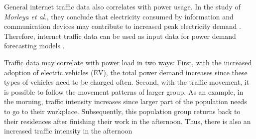 General internet traffic data also correlates with power usage.
In the study of \textit{Morleya et al.}, they conclude that 
electricity consumed by information and communication devices
may contribute to increased peak electricity demand 
\cite{internettrafficenergycorrelation}.
Therefore, internet traffic data can be used as input data for 
power demand forecasting models \cite{electricityinternetforecast}. 

Traffic data may correlate with power load in two ways: First, with the
increased adoption of electric vehicles (EV), the total power demand increases 
since these types of vehicles need to be charged often. 
Second, with the traffic movement, it is possible to follow the
movement patterns of larger group. As an example, in the morning,
traffic intensity increases since larger part of the population needs
to go to their workplace. Subsequently, this population group
returns back to their residences after finishing their work in the afternoon.
Thus, there is also an increased traffic intensity in the afternoon 
